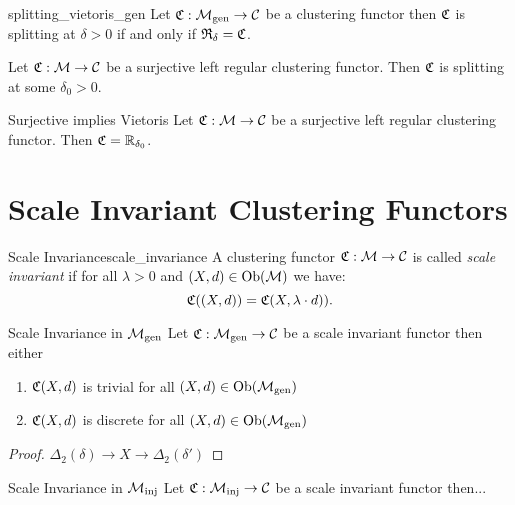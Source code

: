 \begin{proposition}{}{splitting_vietoris_gen}
    Let $\mathfrak{C}: {\mathcal{M}_\mathrm{gen}} \to \mathcal{C}$ be a clustering functor then $\mathfrak{C}$ is splitting at $\delta > 0$ if and only if $\mathfrak{R}_\delta = \mathfrak{C}$.
\end{proposition}

\begin{corollary}{}{}
    Let $\mathfrak{C}: \mathcal{M} \to \mathcal{C}$ be a surjective left regular clustering functor. Then $\mathfrak{C}$ is splitting at some $\delta_0 > 0$.

    \newresult
\end{corollary}

\begin{corollary}{Surjective implies Vietoris}{}
    Let $\mathfrak{C}: \mathcal{M} \to \mathcal{C}$ be a surjective left regular clustering functor. Then $\mathfrak{C} = \mathbb R_{\delta_0}$.

    \newresult
\end{corollary}

\section{Scale Invariant Clustering Functors}

\begin{definition}{Scale Invariance}{scale_invariance}
    A clustering functor $\mathfrak{C}: \mathcal{M} \to \mathcal{C}$ is called \emph{scale invariant} if for all $\lambda > 0$ and $(X,d) \in \mathrm {Ob}(\mathcal{M})$ we have:
    \begin{equation*}
        \mathfrak{C}((X,d)) = \mathfrak{C}(X,\lambda \cdot d)).
    \end{equation*}
\end{definition}

\begin{proposition}{Scale Invariance in ${\mathcal{M}_\mathrm{gen}}$}{}
    Let $\mathfrak{C}: {\mathcal{M}_\mathrm{gen}} \to \mathcal{C}$ be a scale invariant functor then either
    \begin{enumerate}
        \item $\mathfrak{C}(X,d)$ is trivial for all $(X,d) \in \mathrm {Ob}({\mathcal{M}_\mathrm{gen}})$
        \item $\mathfrak{C}(X,d)$ is discrete for all $(X,d) \in \mathrm {Ob}({\mathcal{M}_\mathrm{gen}})$
    \end{enumerate}
\end{proposition}

\begin{proof}
    $\Delta_2(\delta) \to X \to \Delta_2(\delta')$
\end{proof}

\begin{proposition}{Scale Invariance in ${\mathcal{M}_\mathrm{inj}}$}{}
    Let $\mathfrak{C}: {\mathcal{M}_\mathrm{inj}} \to \mathcal{C}$ be a scale invariant functor then...
\end{proposition}

